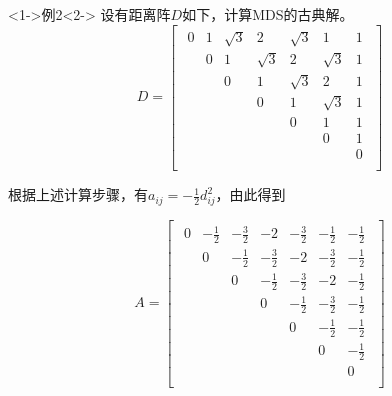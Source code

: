\documentclass[UTF8, compress]{ctexbeamer}
\begin{document}
	
	\begin{frame}
		
		\begin{exampleblock}<1->{\heiti 例2}<2->
			设有距离阵$D$如下，计算MDS的古典解。
			\begin{equation}
			D=
			\begin{bmatrix}
			\begin{smallmatrix}
				0 & 1 & \sqrt3 & 2 & \sqrt3 & 1 & 1 \\
				& 0 & 1 & \sqrt3 & 2 & \sqrt3 & 1 \\
				&   & 0 & 1 & \sqrt3 & 2 & 1 \\
				&   &   & 0 & 1 & \sqrt3 & 1 \\
				&   &   &   & 0 & 1 & 1 \\
				&   &   &   &   & 0 & 1 \\
				&   &   &   &   &   & 0 \\
			\end{smallmatrix}
			\end{bmatrix}
			\end{equation}
			
		\end{exampleblock}
	
		
		根据上述计算步骤，有$a_{ij}=-\frac12d_{ij}^2$，由此得到
		
		
		\begin{equation}
		A=
		\begin{bmatrix}
		\begin{smallmatrix}
			0 & -\frac12 & -\frac32 & -2 & -\frac32 & -\frac12 & -\frac12 \\[3pt]
			& 0 & -\frac12 & -\frac32 & -2 & -\frac32 & -\frac12 \\[3pt]
			&   & 0 & -\frac12 & -\frac32 & -2 & -\frac12 \\[3pt]
			&   &   & 0 & -\frac12 & -\frac32 & -\frac12 \\[3pt]
			&   &   &   & 0 & -\frac12 & -\frac12 \\[3pt]
			&   &   &   &   & 0 & -\frac12 \\[3pt]
			&   &   &   &   &   & 0 \\
		\end{smallmatrix}
		\end{bmatrix}
		\end{equation}
	
	\end{frame}
	
\end{document}

